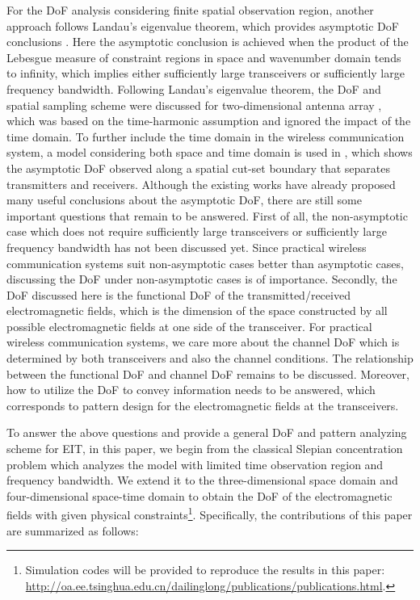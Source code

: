 \documentclass[12pt,draftclsnofoot,journal,onecolumn]{IEEEtran}
\begin{document}
For the DoF analysis considering finite spatial observation region, another approach follows Landau's eigenvalue theorem, which provides asymptotic DoF conclusions \cite{landau1980eigenvalue}. Here the asymptotic conclusion is achieved when the product of the Lebesgue measure of constraint regions in space and wavenumber domain tends to infinity, which implies either sufficiently large transceivers or sufficiently large frequency bandwidth. Following Landau's eigenvalue theorem, the DoF and spatial sampling scheme were discussed for two-dimensional antenna array \cite{pizzo2022nyquist}, which was based on the time-harmonic assumption and ignored the impact of the time domain. 
To further include the time domain in the wireless communication system, a model considering both space and time domain is used in \cite{franceschetti2015landau}, which shows the asymptotic DoF observed along a spatial cut-set boundary that separates transmitters and receivers. Although the existing works have already proposed many useful conclusions about the asymptotic DoF, there are still some important questions that remain to be answered. First of all, the non-asymptotic case which does not require sufficiently large transceivers or sufficiently large frequency bandwidth has not been discussed yet. Since practical wireless communication systems suit non-asymptotic cases better than asymptotic cases, discussing the DoF under non-asymptotic cases is of importance. Secondly, the DoF discussed here is the functional DoF of the transmitted/received electromagnetic fields, which is the dimension of the space constructed by all possible electromagnetic fields at one side of the transceiver\cite{zhu2022electromagnetic}. For practical wireless communication systems, we care more about the channel DoF which is determined by both transceivers and also the channel conditions. The relationship between the functional DoF and channel DoF remains to be discussed. 
Moreover, how to utilize the DoF to convey information needs to be answered, which corresponds to pattern design for the electromagnetic fields at the transceivers. 

To answer the above questions and provide a general DoF and pattern analyzing scheme for EIT, in this paper, we begin from the classical Slepian concentration problem which analyzes the model with limited time observation region and frequency bandwidth. We extend it to the three-dimensional space domain and four-dimensional space-time domain to obtain the DoF of the electromagnetic fields with given physical constraints\footnote{Simulation codes will be provided to reproduce the results in this paper: \url{http://oa.ee.tsinghua.edu.cn/dailinglong/publications/publications.html}.}.  Specifically, the contributions of this paper are summarized as follows:
\end{document}
